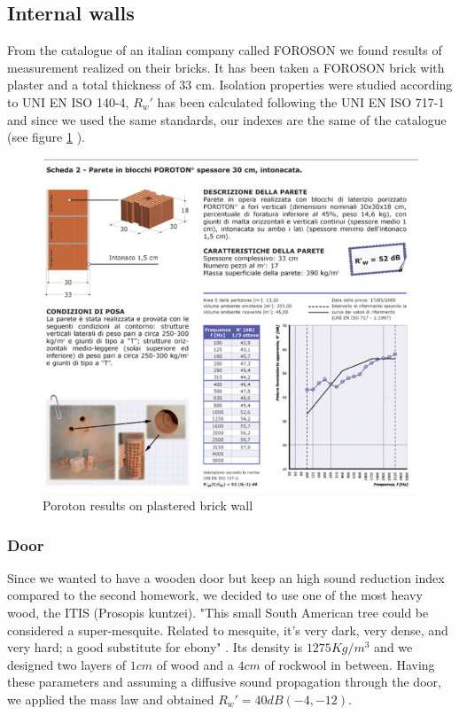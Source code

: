 \documentclass[]{scrartcl}
\begin{document}
\subsection{Internal walls}
From the catalogue of an italian company called FOROSON we found results of measurement realized on their bricks. It has been taken a FOROSON brick with plaster and a total thickness of $33$ cm. Isolation properties were studied according to UNI EN ISO 140-4, $R_w'$ has been calculated following the UNI EN ISO 717-1 and since we used the same standards, our indexes are the same of the catalogue (see figure \ref{fig:poroton} ).
\begin{figure}[h]
	\centering
	\includegraphics[width=0.9\linewidth]{poroton}
	\caption{Poroton results on plastered brick wall}
	\label{fig:poroton}
\end{figure}

\subsubsection{Door}
Since we wanted to have a wooden door but keep an high sound reduction index compared to the second homework, we decided to use one of the most heavy wood, the ITIS (Prosopis kuntzei). "This small South American tree could be considered a super-mesquite. Related to mesquite, it’s very dark, very dense, and very hard; a good substitute for ebony" \cite{wood}. Its density is $\mathit{1275 Kg/m^3}$ and we designed two layers of $\mathit{1 cm}$ of wood and a $\mathit{4 cm}$ of rockwool in between. Having these parameters and assuming a diffusive sound propagation through the door, we applied the mass law and obtained $R_w'= 40 dB (-4, -12)$. 
\end{document}
